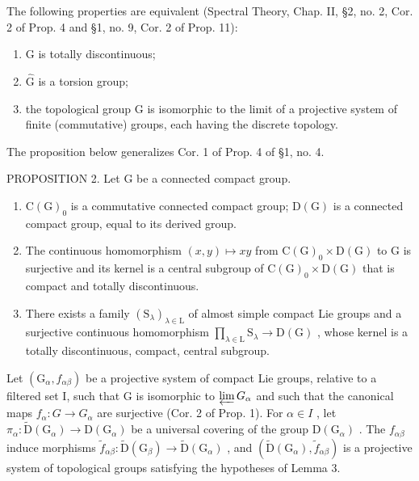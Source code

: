 The following properties are equivalent (Spectral Theory, Chap. II, §2, no. 2, Cor. 2 of Prop. 4 and §1, no. 9, Cor. 2 of Prop. 11):

\begin{enumerate}
\def\labelenumi{(\roman{enumi})}
\item
  G is totally discontinuous;
\item
  \(\hat{\mathrm{G}}\) is a torsion group;
\item
  the topological group G is isomorphic to the limit of a projective system of finite (commutative) groups, each having the discrete topology.
\end{enumerate}

The proposition below generalizes Cor. 1 of Prop. 4 of §1, no. 4.

PROPOSITION 2. Let G be a connected compact group.

\begin{enumerate}
\def\labelenumi{\alph{enumi})}
\item
  \(\mathrm{C}(\mathrm{G})_{0}\) is a commutative connected compact group; \(\mathrm{D}(\mathrm{G})\) is a connected compact group, equal to its derived group.
\item
  The continuous homomorphism \((x,y)\mapsto xy\) from \(\mathrm{C}(\mathrm{G})_{0}\times\mathrm{D}(\mathrm{G})\) to G is surjective and its kernel is a central subgroup of \(\mathrm{C}(\mathrm{G})_{0}\times\mathrm{D}(\mathrm{G})\) that is compact and totally discontinuous.
\item
  There exists a family \((\mathrm{S}_{\lambda})_{\lambda\in\mathrm{L}}\) of almost simple compact Lie groups and a surjective continuous homomorphism \(\prod_{\lambda\in\mathrm{L}}\mathrm{S}_{\lambda}\to\mathrm{D}(\mathrm{G})\) , whose kernel is a totally discontinuous, compact, central subgroup.
\end{enumerate}

Let \((\mathrm{G}_{\alpha}, f_{\alpha\beta})\) be a projective system of compact Lie groups, relative to a filtered set I, such that G is isomorphic to \(\varprojlim G_{\alpha}\) and such that the canonical maps \(f_{\alpha}: G \to G_{\alpha}\) are surjective (Cor. 2 of Prop. 1). For \(\alpha \in I\) , let \(\pi_{\alpha}: \tilde{\mathrm{D}}(\mathrm{G}_{\alpha}) \to \mathrm{D}(\mathrm{G}_{\alpha})\) be a universal covering of the group \(\mathrm{D}(\mathrm{G}_{\alpha})\) . The \(f_{\alpha\beta}\) induce morphisms \(\tilde{f}_{\alpha\beta}: \tilde{\mathrm{D}}(\mathrm{G}_{\beta}) \to \tilde{\mathrm{D}}(\mathrm{G}_{\alpha})\) , and \((\tilde{\mathrm{D}}(\mathrm{G}_{\alpha}), \tilde{f}_{\alpha\beta})\) is a projective system of topological groups satisfying the hypotheses of Lemma 3.

